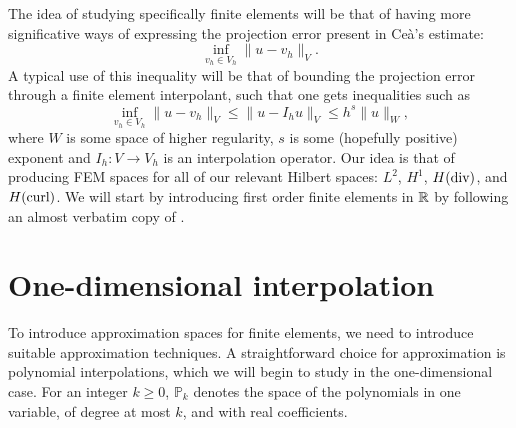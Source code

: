 The idea of studying specifically finite elements will be that of having more significative ways of expressing the projection error present in Ceà's estimate: 
    \begin{equation*}
\inf_{v_h\in V_h} \| u - v_h\|_V.
\end{equation*}
A typical use of this inequality will be that of bounding the projection error through a finite element interpolant, such that one gets inequalities such as
    \begin{equation*}
\inf_{v_h\in V_h} \| u - v_h\|_V \leq \| u - I_h u \|_V \leq h^s \|u \|_W,
\end{equation*}
    where $W$ is some space of higher regularity, $s$ is some (hopefully positive) exponent and $I_h:V \to V_h$ is an interpolation operator. Our idea is that of producing FEM spaces for all of our relevant Hilbert spaces: $L^2$, $H^1$, $H(\operatorname{\text{div}})$, and $H(\operatorname{\text{curl}})$. We will start by introducing first order finite elements in $\mathbb{R}$ by following an almost verbatim copy of \cite[Chapter 1]{ern2004theory}. 

\section{One-dimensional interpolation} 

To introduce approximation spaces for finite elements, we need to introduce suitable approximation techniques. A straightforward choice for approximation is polynomial interpolations, which we will begin to study in the one-dimensional case. For an integer $k \ge 0$, $\mathbb{P}_k$ denotes the space of the polynomials in one variable, of degree at most $k$, and with real coefficients.

